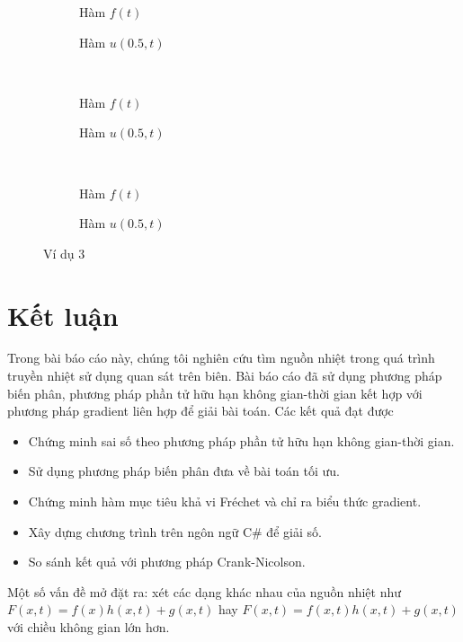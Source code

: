 \documentclass[]{article}
\begin{document}
\begin{figure}[t!]
	\begin{subfigure}{.5\linewidth}
		\centering
		\caption{Hàm $f(t)$}
		\label{f210}
	\end{subfigure}%
	\begin{subfigure}{.5\linewidth}
		\centering
		\caption{Hàm $u(0.5, t)$}
		\label{u210}
	\end{subfigure}
	\\
	\begin{subfigure}{.5\linewidth}
		\centering
		\caption{Hàm $f(t)$}
		\label{f215}
	\end{subfigure}%
	\begin{subfigure}{.5\linewidth}
		\centering
		\caption{Hàm $u(0.5, t)$}
		\label{u215}
	\end{subfigure}
	\\
	\begin{subfigure}{.5\linewidth}
		\centering
		\caption{Hàm $f(t)$}
		\label{f220}
	\end{subfigure}%
	\begin{subfigure}{.5\linewidth}
		\centering
		\caption{Hàm $u(0.5, t)$}
		\label{u220}
	\end{subfigure}
	\caption{Ví dụ 3}
	\label{ex3}
\end{figure}


\newpage
\section{Kết luận}
\qquad Trong bài báo cáo này, chúng tôi nghiên cứu tìm nguồn nhiệt trong quá trình truyền nhiệt sử dụng quan sát trên biên. Bài báo cáo đã sử dụng phương pháp biến phân, phương pháp phần tử hữu hạn không gian-thời gian kết hợp với phương pháp gradient liên hợp để giải bài toán. Các kết quả đạt được
\begin{itemize}
	\item  Chứng minh sai số theo phương pháp phần tử hữu hạn không gian-thời gian.
	\item Sử dụng phương pháp biến phân đưa về bài toán tối ưu.
	\item Chứng minh hàm mục tiêu khả vi Fréchet và chỉ ra biểu thức gradient.
	\item Xây dựng chương trình trên ngôn ngữ C\# để giải số.
	\item So sánh kết quả với phương pháp Crank-Nicolson.
\end{itemize}
Một số vấn đề mở đặt ra: xét các dạng khác nhau của nguồn nhiệt như $F(x, t)=f(x)h(x, t)+g(x, t)$ hay $F(x, t)=f(x, t)h(x, t)+g(x, t)$ với chiều không gian lớn hơn.
\newpage
{}
{}

\end{document}

